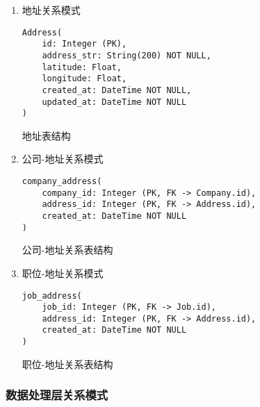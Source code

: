 \begin{enumerate}
  \item 地址关系模式
  \begin{listing}[htbp]
    \begin{verbatim}
Address(
    id: Integer (PK),
    address_str: String(200) NOT NULL,
    latitude: Float,
    longitude: Float,
    created_at: DateTime NOT NULL,
    updated_at: DateTime NOT NULL
)
    \end{verbatim}
    \caption{地址表结构}\label{lst:address_schema}
  \end{listing}

  \item 公司-地址关系模式
  \begin{listing}[htbp]
    \begin{verbatim}
company_address(
    company_id: Integer (PK, FK -> Company.id),
    address_id: Integer (PK, FK -> Address.id),
    created_at: DateTime NOT NULL
)
    \end{verbatim}
    \caption{公司-地址关系表结构}\label{lst:company_address_schema}
  \end{listing}

  \item 职位-地址关系模式
  \begin{listing}[htbp]
    \begin{verbatim}
job_address(
    job_id: Integer (PK, FK -> Job.id),
    address_id: Integer (PK, FK -> Address.id),
    created_at: DateTime NOT NULL
)
    \end{verbatim}
    \caption{职位-地址关系表结构}\label{lst:job_address_schema}
  \end{listing}
\end{enumerate}

\subsubsection{数据处理层关系模式}

